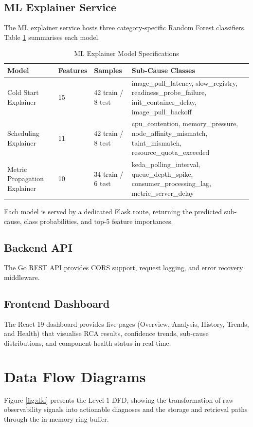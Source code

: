 \subsection{ML Explainer Service}
The ML explainer service hosts three category-specific Random Forest classifiers. Table \ref{tab:ml_models} summarises each model.

\begin{table}[H]
\centering
\begin{tabularx}{\textwidth}{|l|l|l|X|}
\hline
\textbf{Model} & \textbf{Features} & \textbf{Samples} & \textbf{Sub-Cause Classes} \\ \hline
Cold Start Explainer & 15 & 42 train / 8 test & image\_pull\_latency, slow\_registry, readiness\_probe\_failure, init\_container\_delay, image\_pull\_backoff \\ \hline
Scheduling Explainer & 11 & 42 train / 8 test & cpu\_contention, memory\_pressure, node\_affinity\_mismatch, taint\_mismatch, resource\_quota\_exceeded \\ \hline
Metric Propagation Explainer & 10 & 34 train / 6 test & keda\_polling\_interval, queue\_depth\_spike, consumer\_processing\_lag, metric\_server\_delay \\ \hline
\end{tabularx}
\caption{ML Explainer Model Specifications}
\label{tab:ml_models}
\end{table}

Each model is served by a dedicated Flask route, returning the predicted sub-cause, class probabilities, and top-5 feature importances.

\subsection{Backend API}
The Go REST API provides CORS support, request logging, and error recovery middleware.

\subsection{Frontend Dashboard}
The React 19 dashboard provides five pages (Overview, Analysis, History, Trends, and Health) that visualise RCA results, confidence trends, sub-cause distributions, and component health status in real time.

\section{Data Flow Diagrams}
Figure \ref{fig:dfd} presents the Level 1 DFD, showing the transformation of raw observability signals into actionable diagnoses and the storage and retrieval paths through the in-memory ring buffer.

